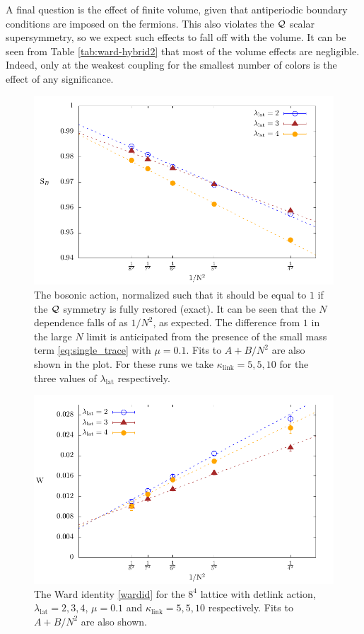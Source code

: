A final question is the effect of finite volume, given that antiperiodic boundary
conditions are imposed on the fermions.  This also violates the $\mathcal Q$ scalar supersymmetry,
so we expect such effects to fall off with the volume.  It can be seen from Table
\ref{tab:ward-hybrid2} that most of the volume effects are negligible.  Indeed, only
at the weakest coupling for the smallest number of colors is the effect of
any significance.

\begin{figure}
\begin{center}
\includegraphics[width=5in]{./Figures/action_detlink_L8.pdf}
\caption{The bosonic action, normalized such that it should be equal to $1$ if
the $\mathcal Q$ symmetry is fully restored (exact).  It can be seen that the $N$ dependence
falls of as $1/N^2$, as expected.  The difference from $1$ in the large $N$
limit is anticipated from the presence of the small
mass term \ref{eq:single_trace} with $\mu=0.1$. Fits to $A + B/N^2$ are also shown in the plot.
For these runs we take $\kappa_\text{link}=5,5,10$ for the three values of $\lambda_{\text{lat}}$ respectively.
\label{SBcombo}}
\end{center}
\end{figure}

\begin{figure}
\begin{center}
\includegraphics[width=5in]{./Figures/ward_detlink_L8.pdf}
\caption{The Ward identity \ref{wardid} for the $8^4$ lattice with detlink action, 
$\lambda_{\text{lat}}=2,3,4$, $\mu=0.1$ and $\kappa_\text{link}=5,5,10$ respectively. 
Fits to $A + B/N^2$ are also shown. 
\label{wdl468}}
\end{center}
\end{figure}


